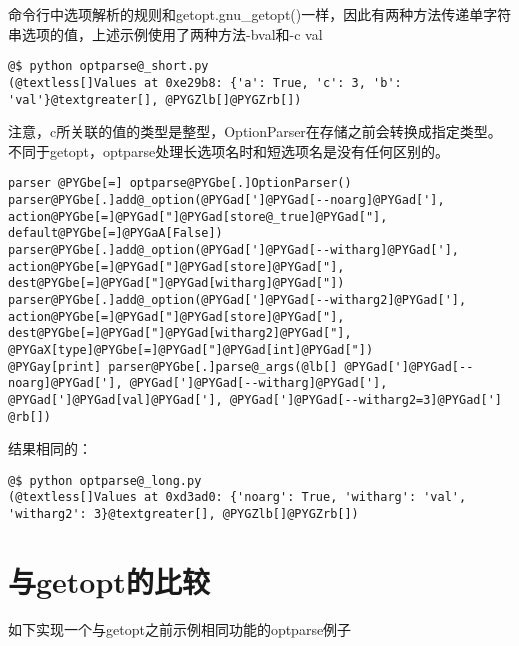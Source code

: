 \documentclass[a4paper,10pt,english]{manual}
\begin{document}
命令行中选项解析的规则和getopt.gnu\_getopt()一样，因此有两种方法传递单字符串选项的值，上述示例使用了两种方法-bval和-c val

\begin{Verbatim}[commandchars=@\[\]]
@$ python optparse@_short.py
(@textless[]Values at 0xe29b8: {'a': True, 'c': 3, 'b': 'val'}@textgreater[], @PYGZlb[]@PYGZrb[])
\end{Verbatim}

注意，c所关联的值的类型是整型，OptionParser在存储之前会转换成指定类型。不同于getopt，optparse处理长选项名时和短选项名是没有任何区别的。

\begin{Verbatim}[commandchars=@\[\]]
parser @PYGbe[=] optparse@PYGbe[.]OptionParser()
parser@PYGbe[.]add@_option(@PYGad[']@PYGad[--noarg]@PYGad['], action@PYGbe[=]@PYGad["]@PYGad[store@_true]@PYGad["], default@PYGbe[=]@PYGaA[False])
parser@PYGbe[.]add@_option(@PYGad[']@PYGad[--witharg]@PYGad['], action@PYGbe[=]@PYGad["]@PYGad[store]@PYGad["], dest@PYGbe[=]@PYGad["]@PYGad[witharg]@PYGad["])
parser@PYGbe[.]add@_option(@PYGad[']@PYGad[--witharg2]@PYGad['], action@PYGbe[=]@PYGad["]@PYGad[store]@PYGad["], dest@PYGbe[=]@PYGad["]@PYGad[witharg2]@PYGad["], @PYGaX[type]@PYGbe[=]@PYGad["]@PYGad[int]@PYGad["])
@PYGay[print] parser@PYGbe[.]parse@_args(@lb[] @PYGad[']@PYGad[--noarg]@PYGad['], @PYGad[']@PYGad[--witharg]@PYGad['], @PYGad[']@PYGad[val]@PYGad['], @PYGad[']@PYGad[--witharg2=3]@PYGad['] @rb[])
\end{Verbatim}

结果相同的：

\begin{Verbatim}[commandchars=@\[\]]
@$ python optparse@_long.py
(@textless[]Values at 0xd3ad0: {'noarg': True, 'witharg': 'val', 'witharg2': 3}@textgreater[], @PYGZlb[]@PYGZrb[])
\end{Verbatim}


\section{与getopt的比较}

如下实现一个与getopt之前示例相同功能的optparse例子
\end{document}
